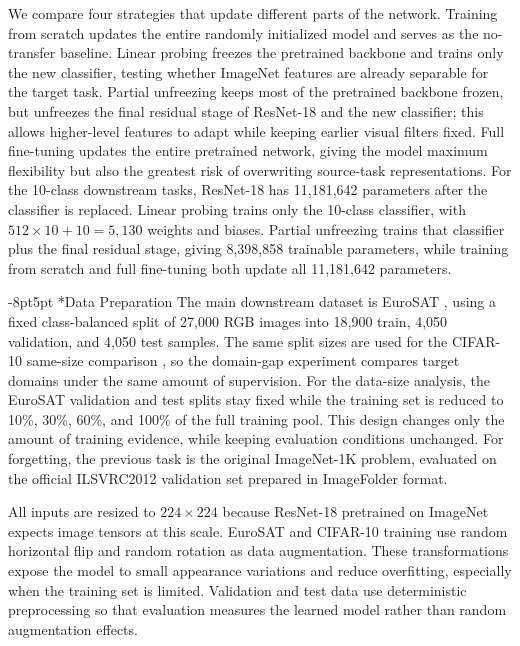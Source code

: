 \documentclass[10pt,twocolumn,letterpaper]{article}
\makeatletter
\def\cvprsubsection{\@startsection {subsection}{2}{\z@}
   {-8pt}{5pt} {\normalsize\bfseries}}
\def\cvprssubsect#1{\cvprsubsection*{#1}}
\def\cvprsubsect#1{\cvprsubsection{\texorpdfstring{\hskip -1em.~}{}#1}}
\def\subsection{\@ifstar\cvprssubsect\cvprsubsect}
\makeatother
\begin{document}
We compare four strategies that update different parts of the network. Training from scratch updates the entire randomly initialized model and serves as the no-transfer baseline. Linear probing freezes the pretrained backbone and trains only the new classifier, testing whether ImageNet features are already separable for the target task. Partial unfreezing keeps most of the pretrained backbone frozen, but unfreezes the final residual stage of ResNet-18 and the new classifier; this allows higher-level features to adapt while keeping earlier visual filters fixed. Full fine-tuning updates the entire pretrained network, giving the model maximum flexibility but also the greatest risk of overwriting source-task representations. For the 10-class downstream tasks, ResNet-18 has 11,181,642 parameters after the classifier is replaced. Linear probing trains only the 10-class classifier, with $512 \times 10 + 10 = 5,130$ weights and biases. Partial unfreezing trains that classifier plus the final residual stage, giving 8,398,858 trainable parameters, while training from scratch and full fine-tuning both update all 11,181,642 parameters.

\workflowfigure

\subsection{Data Preparation}
The main downstream dataset is EuroSAT \cite{helber2019}, using a fixed class-balanced split of 27,000 RGB images into 18,900 train, 4,050 validation, and 4,050 test samples. The same split sizes are used for the CIFAR-10 same-size comparison \cite{krizhevsky2009}, so the domain-gap experiment compares target domains under the same amount of supervision. For the data-size analysis, the EuroSAT validation and test splits stay fixed while the training set is reduced to 10\%, 30\%, 60\%, and 100\% of the full training pool. This design changes only the amount of training evidence, while keeping evaluation conditions unchanged. For forgetting, the previous task is the original ImageNet-1K problem, evaluated on the official ILSVRC2012 validation set prepared in ImageFolder format.

All inputs are resized to $224 \times 224$ because ResNet-18 pretrained on ImageNet expects image tensors at this scale. EuroSAT and CIFAR-10 training use random horizontal flip and random rotation as data augmentation. These transformations expose the model to small appearance variations and reduce overfitting, especially when the training set is limited. Validation and test data use deterministic preprocessing so that evaluation measures the learned model rather than random augmentation effects.
\end{document}
